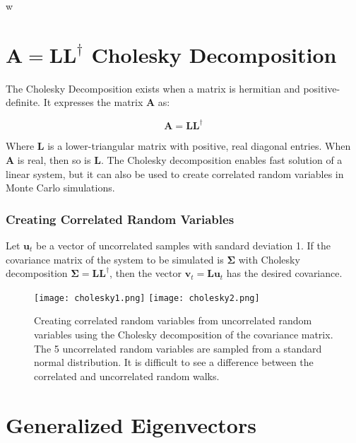 w

\section{$\mathbf{A} = \mathbf{L}\mathbf{L}^{\dagger}$ Cholesky Decomposition}
\label{sec:cholesky}

The Cholesky Decomposition exists when a matrix is hermitian and positive-definite. It expresses the matrix $\mathbf{A}$ as:

\begin{equation}
\mathbf{A} = \mathbf{L}\mathbf{L^\dagger}
\end{equation}

Where $\mathbf{L}$ is a lower-triangular matrix with positive, real diagonal entries. When $\mathbf{A}$ is real, then so is $\mathbf{L}$. The Cholesky decomposition enables fast solution of a linear system, but it can also be used to create correlated random variables in Monte Carlo simulations. 

\subsubsection{Creating Correlated Random Variables}
Let $\mathbf{u}_t$ be a vector of uncorrelated samples with sandard deviation 1. If the covariance matrix of the system to be simulated is  $\mathbf{\Sigma}$ with Cholesky decomposition $\mathbf{\Sigma} = \mathbf{LL}^\dagger$, then the vector $\mathbf{v}_t = \mathbf{Lu}_t$ has the desired covariance.

\begin{figure}
\centering
\texttt{[image: cholesky1.png]}
\texttt{[image: cholesky2.png]}
\caption{Creating correlated random variables from uncorrelated random variables using the Cholesky decomposition of the covariance matrix. The 5 uncorrelated random variables are sampled from a standard normal distribution. It is difficult to see a difference between the correlated and uncorrelated random walks.}
\end{figure}



\section{Generalized Eigenvectors}










\chapauthor{}
